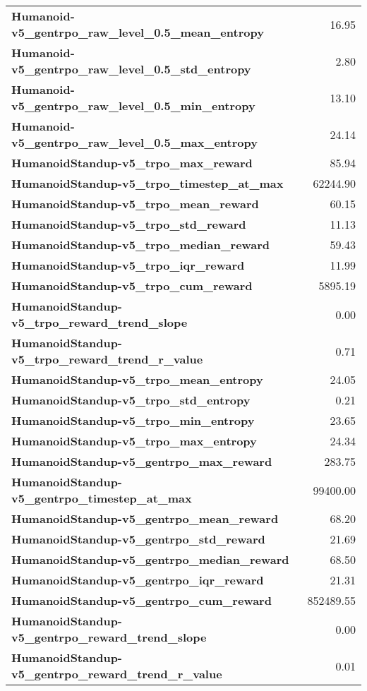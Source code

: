 \begin{tabular}{lr}
\textbf{Humanoid-v5_gentrpo_raw_level_0.5_mean_entropy} & 16.95 \\
\textbf{Humanoid-v5_gentrpo_raw_level_0.5_std_entropy} & 2.80 \\
\textbf{Humanoid-v5_gentrpo_raw_level_0.5_min_entropy} & 13.10 \\
\textbf{Humanoid-v5_gentrpo_raw_level_0.5_max_entropy} & 24.14 \\
\textbf{HumanoidStandup-v5_trpo_max_reward} & 85.94 \\
\textbf{HumanoidStandup-v5_trpo_timestep_at_max} & 62244.90 \\
\textbf{HumanoidStandup-v5_trpo_mean_reward} & 60.15 \\
\textbf{HumanoidStandup-v5_trpo_std_reward} & 11.13 \\
\textbf{HumanoidStandup-v5_trpo_median_reward} & 59.43 \\
\textbf{HumanoidStandup-v5_trpo_iqr_reward} & 11.99 \\
\textbf{HumanoidStandup-v5_trpo_cum_reward} & 5895.19 \\
\textbf{HumanoidStandup-v5_trpo_reward_trend_slope} & 0.00 \\
\textbf{HumanoidStandup-v5_trpo_reward_trend_r_value} & 0.71 \\
\textbf{HumanoidStandup-v5_trpo_mean_entropy} & 24.05 \\
\textbf{HumanoidStandup-v5_trpo_std_entropy} & 0.21 \\
\textbf{HumanoidStandup-v5_trpo_min_entropy} & 23.65 \\
\textbf{HumanoidStandup-v5_trpo_max_entropy} & 24.34 \\
\textbf{HumanoidStandup-v5_gentrpo_max_reward} & 283.75 \\
\textbf{HumanoidStandup-v5_gentrpo_timestep_at_max} & 99400.00 \\
\textbf{HumanoidStandup-v5_gentrpo_mean_reward} & 68.20 \\
\textbf{HumanoidStandup-v5_gentrpo_std_reward} & 21.69 \\
\textbf{HumanoidStandup-v5_gentrpo_median_reward} & 68.50 \\
\textbf{HumanoidStandup-v5_gentrpo_iqr_reward} & 21.31 \\
\textbf{HumanoidStandup-v5_gentrpo_cum_reward} & 852489.55 \\
\textbf{HumanoidStandup-v5_gentrpo_reward_trend_slope} & 0.00 \\
\textbf{HumanoidStandup-v5_gentrpo_reward_trend_r_value} & 0.01 \\

\end{tabular}
